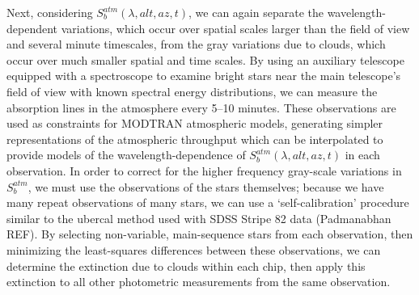 \documentclass[12pt,preprint]{aastex}
\begin{document}
Next, considering $S_b^{atm}(\lambda,alt,az,t)$, we can again
separate the wavelength-dependent variations, which occur over
spatial scales larger than the field of view and several minute timescales, from the gray
variations due to clouds, which occur over much smaller spatial and
time scales. By using an auxiliary telescope equipped with a
spectroscope to examine bright stars near the main telescope's field
of view with known spectral energy
distributions, we can measure the absorption lines in
the atmosphere every 5--10 minutes. These observations are used as
constraints for MODTRAN atmospheric models, generating simpler
representations of the atmospheric throughput which can be
interpolated to provide models of the wavelength-dependence of
$S_b^{atm}(\lambda,alt,az,t)$ in each observation. In order to correct
for the higher frequency gray-scale variations in $S_b^{atm}$, we must
use the observations of the stars themselves; because we have many repeat
observations of many stars, we can use a `self-calibration' procedure
similar to the ubercal method used with SDSS Stripe 82 data
(Padmanabhan REF). By selecting non-variable, main-sequence stars
from each observation, then minimizing the least-squares differences
between these observations, we can determine the extinction due to
clouds within each chip, then apply this extinction to all other
photometric measurements from the same observation. 
\end{document}

